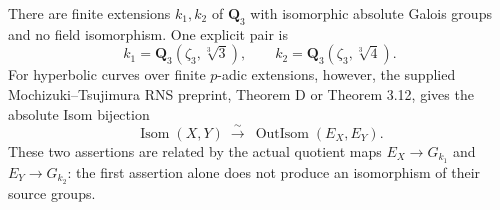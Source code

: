 \begin{proposition}
\label{A:local-absolute-isom}
There are finite extensions $k_1,k_2$ of $\mathbf Q_3$ with
isomorphic absolute Galois groups and no field isomorphism.
One explicit pair is
\[
 k_1=\mathbf Q_3(\zeta_3,\sqrt[3]{3}),\qquad
 k_2=\mathbf Q_3(\zeta_3,\sqrt[3]{4}).
\]
For hyperbolic curves over finite $p$-adic extensions, however,
the supplied Mochizuki--Tsujimura RNS preprint, Theorem D
or Theorem 3.12, gives the absolute Isom bijection
\[
 \operatorname{Isom}(X,Y)\ \xrightarrow{\sim}\
 \operatorname{OutIsom}(E_X,E_Y).
\]
These two assertions are related by the actual quotient maps
$E_X\to G_{k_1}$ and $E_Y\to G_{k_2}$: the first assertion
alone does not produce an isomorphism of their source groups.
\end{proposition}
